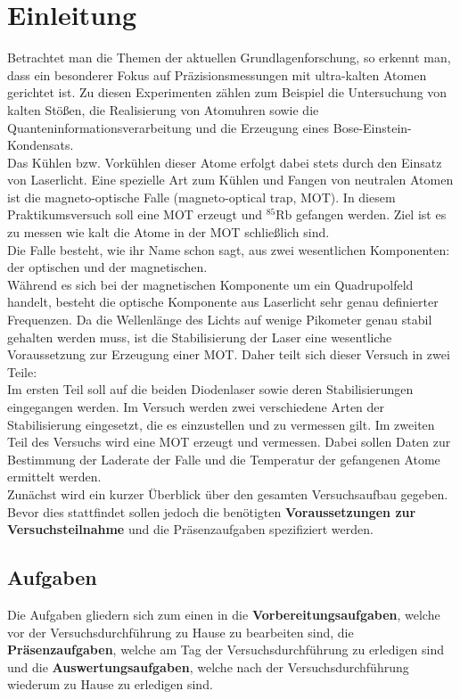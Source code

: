 \documentclass[
class=book,
accentcolor=1b,
custommargins=geometry,
fontsize=11pt,
thesis={type=Versuchsanleitung},
ruledheaders=all,
headline=false,
instbox=false,
marginpar=false,
title=small,
ignore-missing-data=true,
twoside=false,
logofile=apqdesign/tuda_logo.pdf,
pdfa=false %
]{apqpub}
\begin{document}
\chapter{Einleitung}
Betrachtet man die Themen der aktuellen Grundlagenforschung, so erkennt man, dass ein besonderer Fokus auf
Präzisionsmessungen mit ultra-kalten Atomen gerichtet ist. Zu diesen Experimenten zählen zum Beispiel die Untersuchung von kalten Stößen, die Realisierung von Atomuhren sowie die Quanteninformationsverarbeitung und
die Erzeugung eines Bose-Einstein-Kondensats.\\
Das Kühlen bzw. Vorkühlen dieser Atome erfolgt dabei stets durch den Einsatz von Laserlicht. Eine spezielle Art
zum Kühlen und Fangen von neutralen Atomen ist die magneto-optische Falle (magneto-optical trap, MOT). In
diesem Praktikumsversuch soll eine MOT erzeugt und $^{85}$Rb gefangen werden. Ziel ist es zu messen wie kalt die
Atome in der MOT schließlich sind.\\
Die Falle besteht, wie ihr Name schon sagt, aus zwei wesentlichen Komponenten: der optischen und der magnetischen.\\
Während es sich bei der magnetischen Komponente um ein Quadrupolfeld handelt, besteht die optische Komponente
aus Laserlicht sehr genau definierter Frequenzen. Da die Wellenlänge des Lichts auf wenige Pikometer genau stabil
gehalten werden muss, ist die Stabilisierung der Laser eine wesentliche Voraussetzung zur Erzeugung einer MOT.
Daher teilt sich dieser Versuch in zwei Teile:\\
Im ersten Teil soll auf die beiden Diodenlaser sowie deren Stabilisierungen eingegangen werden. Im Versuch werden
zwei verschiedene Arten der Stabilisierung eingesetzt, die es einzustellen und zu vermessen gilt. Im zweiten
Teil des Versuchs wird eine MOT erzeugt und vermessen. Dabei sollen Daten zur Bestimmung der Laderate der
Falle und die Temperatur der gefangenen Atome ermittelt werden.\\
Zunächst wird ein kurzer Überblick über den gesamten Versuchsaufbau gegeben.\\ 
Bevor dies stattfindet sollen jedoch die benötigten \textbf{Voraussetzungen zur Versuchsteilnahme} und die Präsenzaufgaben spezifiziert werden. 

\newpage

\section{Aufgaben}

Die Aufgaben gliedern sich zum einen in die \textbf{Vorbereitungsaufgaben}, welche vor der Versuchsdurchführung zu Hause zu bearbeiten sind, die \textbf{Präsenzaufgaben}, welche am Tag der Versuchsdurchführung zu erledigen sind und die \textbf{Auswertungsaufgaben}, welche nach der Versuchsdurchführung wiederum zu Hause zu erledigen sind.\\
\end{document}
